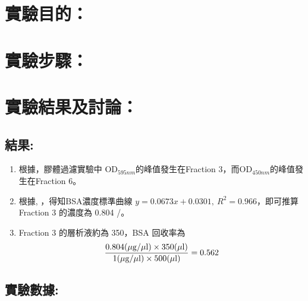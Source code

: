 \setlength{\parindent}{2em} %

\section*{實驗目的：}


\section*{實驗步驟：}


\section*{實驗結果及討論：}
\subsection*{結果:}
\begin{enumerate}
  \item 根據，膠體過濾實驗中 OD$_{595nm}$的峰值發生在Fraction 3，而OD$_{450nm}$的峰值發生在Fraction 6。
  \item 根據,  ，得知BSA濃度標準曲線 $y=0.0673x+0.0301,\ R^2=0.966$，即可推算 Fraction 3 的濃度為 0.804 \mug/\mul。 
  \item Fraction 3 的層析液約為 350\mul ，BSA 回收率為
  $$
  \frac{0.804(\mug/\mul)\times 350(\mul)}{1(\mug/\mul)\times 500(\mul)}=0.562
  $$


\end{enumerate}


  




\subsection*{實驗數據:}

